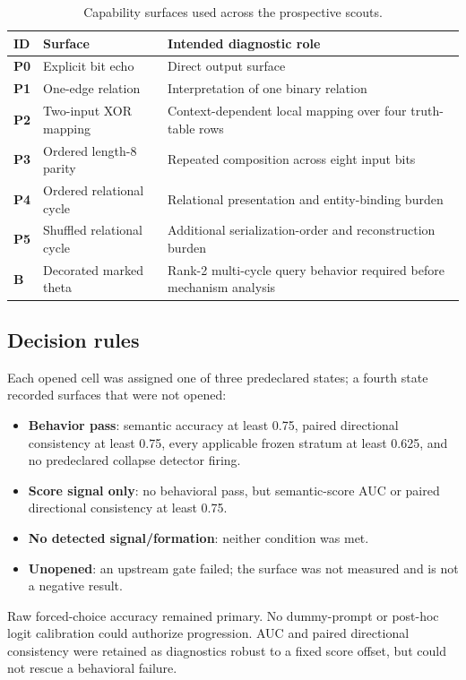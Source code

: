 \documentclass[10pt,a4paper]{article}
\begin{document}
\begin{table}[H]
\centering
\caption{Capability surfaces used across the prospective scouts.}
\label{tab:ladder}
\begin{tabularx}{\textwidth}{@{}>{\bfseries}p{10mm}p{43mm}Y@{}}
\toprule
ID & Surface & Intended diagnostic role \\
\midrule
P0 & Explicit bit echo & Direct output surface \\
P1 & One-edge relation & Interpretation of one binary relation \\
P2 & Two-input XOR mapping & Context-dependent local mapping over four truth-table rows \\
P3 & Ordered length-8 parity & Repeated composition across eight input bits \\
P4 & Ordered relational cycle & Relational presentation and entity-binding burden \\
P5 & Shuffled relational cycle & Additional serialization-order and reconstruction burden \\
B  & Decorated marked theta & Rank-2 multi-cycle query behavior required before mechanism analysis \\
\bottomrule
\end{tabularx}
\end{table}

\subsection{Decision rules}

Each opened cell was assigned one of three predeclared states; a fourth state recorded surfaces that were not opened:

\begin{itemize}
\item \textbf{Behavior pass}: semantic accuracy at least 0.75, paired directional consistency at least 0.75, every applicable frozen stratum at least 0.625, and no predeclared collapse detector firing.
\item \textbf{Score signal only}: no behavioral pass, but semantic-score AUC or paired directional consistency at least 0.75.
\item \textbf{No detected signal/formation}: neither condition was met.
\item \textbf{Unopened}: an upstream gate failed; the surface was not measured and is not a negative result.
\end{itemize}

Raw forced-choice accuracy remained primary. No dummy-prompt or post-hoc logit calibration could authorize progression. AUC and paired directional consistency were retained as diagnostics robust to a fixed score offset, but could not rescue a behavioral failure.
\end{document}
